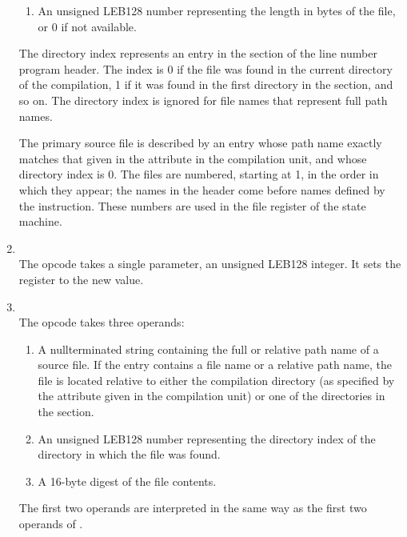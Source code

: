 \begin{enumerate}[1. ]
\begin{enumerate}[1. ]
\item An unsigned LEB128
number representing the length in bytes of the file, or 0 if
not available.
\end{enumerate}

The directory index represents an entry in the
 section of the line number program
header. The index is 0 if the file was found in the current
directory of the compilation, 1 if it was found in the first
directory in the  section,
and so on. The
directory index is ignored for file names that represent full
path names.

The primary source file is described by an entry whose path
name exactly matches that given in the \DWATname{} attribute
in the compilation unit, and whose directory index is 0. The
files are numbered, starting at 1, in the order in which they
appear; the names in the header come before names defined by
the \DWLNEdefinefile{} instruction. These numbers are used
in the file register of the state machine.

\item \textbf{\DWLNEsetdiscriminatorTARG} \\
The \DWLNEsetdiscriminatorTARG{}
opcode takes a single
parameter, an unsigned LEB128 
integer. It sets the
 register to the new value.

\item \textbf{\DWLNEdefinefileMDfiveTARG} \\
The \DWLNEdefinefileMDfiveTARG{} opcode takes three operands:
\begin{enumerate}[1. ]

\item A null\dash terminated string containing the full or relative
path name of a source file. If the entry contains a file
name or a relative path name, the file is located relative
to either the compilation directory (as specified by the
\DWATcompdir{} attribute given in the compilation unit)
or one of the directories in the 
 section.

\item An unsigned LEB128 
number representing the directory index
of the directory in which the file was found.  

\item A 16-byte \MDfive{} digest of the file contents.
\end{enumerate}
The first two operands are interpreted in the same way as the 
first two operands of \DWLNEdefinefile.
\end{enumerate}

